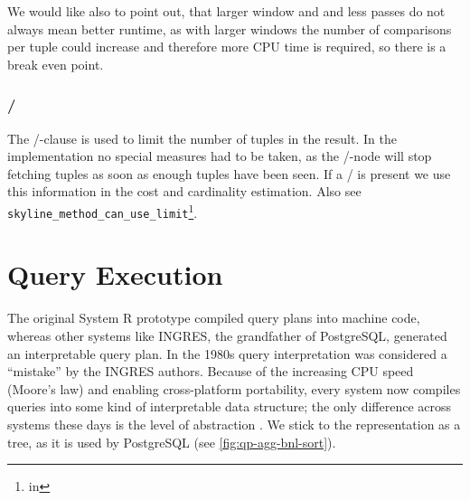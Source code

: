 We would like also to point out, that larger window and and less
passes do not always mean better runtime, as with larger windows the
number of comparisons per tuple could increase and therefore more CPU
time is required, so there is a break even point. 

\subsubsection{ / }
The /-clause is used to limit the
number of tuples in the result.  In the implementation no special
measures had to be taken, as the /-node will stop fetching tuples as soon as enough tuples have been
seen.  If a / is present we use
this information in the cost and cardinality estimation.  Also
see \texttt{skyline\_method\_can\_use\_limit}\footnote{in
}.

\enlargethispage{\baselineskip}
\section{Query Execution}
\label{sec:queryexecution}

The original System R prototype compiled query plans into machine
code, whereas other systems like INGRES, the grandfather of
PostgreSQL, generated an interpretable query plan. In the 1980s query
interpretation was considered a ``mistake'' by the INGRES
authors. Because of the increasing CPU speed (Moore's law) and enabling cross-platform portability, every
system now compiles queries into some kind of interpretable data
structure; the only difference across systems these days is the level
of abstraction \citep{Hellerstein2005}. We stick to the representation
as a tree, as it is used by PostgreSQL (see
\autoref{fig:qp-agg-bnl-sort}).

